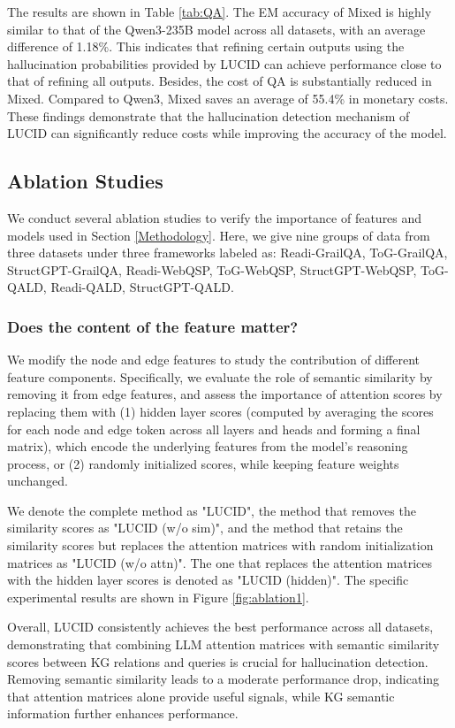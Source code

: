 \documentclass[11pt]{article}
\begin{document}
The results are shown in Table \ref{tab:QA}. The EM accuracy of Mixed is highly similar to that of the Qwen3-235B model across all datasets, with an average difference of 1.18\%. This indicates that refining certain outputs using the hallucination probabilities provided by LUCID can achieve performance close to that of refining all outputs. Besides, the cost of QA is substantially reduced in Mixed. Compared to Qwen3, Mixed saves an average of 55.4\% in monetary costs. These findings demonstrate that the hallucination detection mechanism of LUCID can significantly reduce costs while improving the accuracy of the model.

\subsection{Ablation Studies}\label{ablation}
We conduct several ablation studies to verify the importance of features and models used in Section \ref{Methodology}.  Here, we give nine groups of data from three datasets under three frameworks labeled as: Readi-GrailQA, ToG-GrailQA, StructGPT-GrailQA, Readi-WebQSP,  ToG-WebQSP, StructGPT-WebQSP, ToG-QALD, Readi-QALD, StructGPT-QALD. 

\subsubsection{Does the content of the feature matter?}
We modify the node and edge features to study the contribution of different feature components. Specifically, we evaluate the role of semantic similarity by removing it from edge features, and assess the importance of attention scores by replacing them with (1) hidden layer scores \cite{dai2022knowledge} (computed by averaging the scores for each node and edge token across all layers and heads and forming a final matrix), which encode the underlying features from the model's reasoning process, or (2) randomly initialized scores, while keeping feature weights unchanged.

We denote the complete method as "LUCID", the method that removes the similarity scores as "LUCID (w/o sim)", and the method that retains the similarity scores but replaces the attention matrices with random initialization matrices as "LUCID (w/o attn)". The one that replaces the attention matrices with the hidden layer scores is denoted as "LUCID (hidden)". The specific experimental results are shown in Figure \ref{fig:ablation1}.

Overall, LUCID consistently achieves the best performance across all datasets, demonstrating that combining LLM attention matrices with semantic similarity scores between KG relations and queries is crucial for hallucination detection. Removing semantic similarity leads to a moderate performance drop, indicating that attention matrices alone provide useful signals, while KG semantic information further enhances performance.
\end{document}
